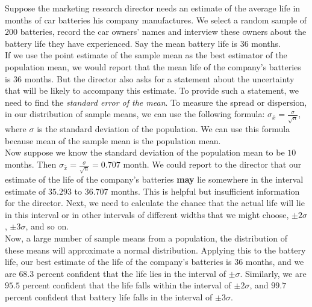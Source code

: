 \documentclass[aima331_lecturenotes_ku.tex]{subfiles}
\begin{document}
\begin{example}
  Suppose the marketing research director needs an estimate of the average life in months of car batteries his company manufactures. We select a random sample of $200$ batteries, record the car owners' names and interview these owners about the battery life they have experienced. Say the mean battery life is $36$ months. \\[2mm]
  If we use the point estimate of the sample mean as the best estimator of the population mean, we would report that the mean life of the company's batteries is $36$ months. But the director also asks for a statement about the uncertainty that will be likely to accompany this estimate. To provide such a statement, we need to find the \textit{standard error of the mean}. To measure the spread or dispersion, in our distribution of sample means, we can use the following formula: $\displaystyle \sigma_{\bar{x}} = \frac{\sigma}{\sqrt{n}}$, where $\sigma$ is the standard deviation of the population. We can use this formula because mean of the sample mean is the population mean.\\[1mm]
  Now suppose we know the standard deviation of the population mean to be $10$ months. Then $\displaystyle \sigma_{\bar{x}} = \frac{\sigma}{\sqrt{n}} = 0.707$ month. We could report to the director that our estimate of the life of the company's batteries \textbf{may} lie somewhere in the interval estimate of $35.293$ to $36.707$ months. This is helpful but insufficient information for the director. Next, we need to calculate the chance that the actual life will lie in this interval or in other intervals of different widths that we might choose, $\pm 2\sigma$, $\pm 3\sigma$, and so on. \\[2mm]
Now, a large number of sample means from a population, the distribution of these means will approximate a normal distribution. Applying this to the battery life, our best estimate of the life of the company's batteries is $36$ months, and we are $68.3$ percent confident that the life lies in the interval of $\pm \sigma$. Similarly, we are $95.5$ percent confident that the life falls within the interval of $\pm 2\sigma$, and $99.7$ percent confident that battery life falls in the interval of $\pm 3 \sigma$.
\end{example}
\end{document}
